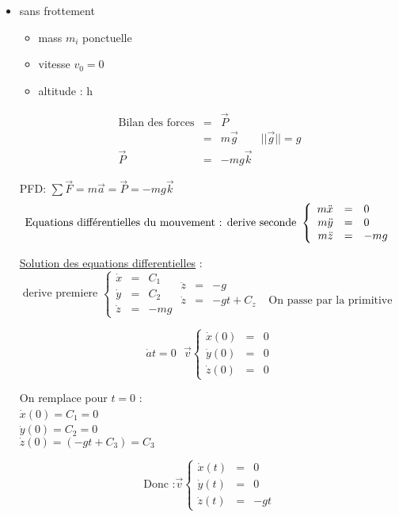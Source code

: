 \begin{itemize}
\item sans frottement \begin{itemize}
	\item mass $m_i$ ponctuelle
	\item vitesse $v_0 = 0$
	\item altitude : h
\end{itemize}

\[\begin{array}{rclr}
	\text{Bilan des forces} &=& \vec{P} \\
					&=& m\vec{g} & ||\vec{g}||=g \\
		\vec{P} &=& -mg\vec{k}\end{array}\]

PFD: $\sum\vec{F} = m\vec{a} = \vec{P} = -mg\vec{k} $
\[ \text{Equations différentielles du mouvement : ~\\
	derive seconde }\left\{ \begin{array}{rcl}
	m\ddot{x} &=& 0 \\
	m\ddot{y} &=& 0 \\
m\ddot{z} &=& -mg \end{array} \right. \]

\ul{Solution des equations differentielles} : ~\\
\[\text{derive premiere } \left\{ \begin{array}{rcl}
			\dot{x} &=&C_1 \\
			\dot{y} &=&C_2 \\
			\dot{z} &=& -mg
		\end{array}\right. \begin{array}{rclr}
			\ddot{z} &=& -g \\
		\dot{z} &=& -gt + C_z & \text{ On passe par la primitive} \end{array}
\]

\[\dot{a}t=0 \text{ } \vec{v} \left\{ \begin{array}{rcl}
			\dot{x}(0) &=&0 \\
			\dot{y}(0) &=&0 \\
	\dot{z}(0) &=&0 \end{array}\right.\] 

			On remplace pour $t=0$ : ~\\
			$\dot{x}(0) = C_1 = 0$ ~\\
			$\dot{y}(0) = C_2 = 0$ ~\\
			$\dot{z}(0) = (-gt+C_3) = C_3$
			
			\[\text{Donc :} \vec{v} \left\{ \begin{array}{rcl} 
			\dot{x}(t) &=&0 \\
			\dot{y}(t) &=&0 \\
			\dot{z}(t) &=& -gt \end{array} \right. \]
\end{itemize}

